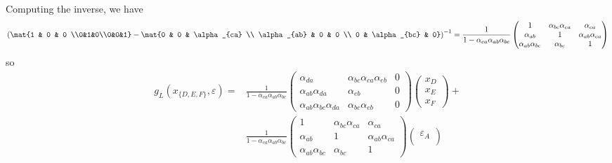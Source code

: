 \begin{enumerate}[label=11.\arabic*]
\begin{gradedsolution}
\begin{enumerate}
\begin{align*}
			\end{align*}
			Computing the inverse, we have
			\begin{equation*}
				\left(\mat{1 & 0           & 0              \\0&1&0\\0&0&1} - \mat{0 & 0 & \alpha_{ca}  \\
					\alpha_{ab}                                      & 0           & 0              \\
					0                                                & \alpha_{bc} & 0}\right)^{-1} = \frac{1}{1-\alpha_{ca}\alpha_{ab}\alpha_{bc}}\begin{pmatrix}
					1                      & \alpha_{bc}\alpha_{ca} & \alpha_{ca}            \\
					\alpha_{ab}            & 1                      & \alpha_{ab}\alpha_{ca} \\
					\alpha_{ab}\alpha_{bc} & \alpha_{bc}            & 1
				\end{pmatrix}
			\end{equation*}
			so
			\begin{align*}
				g_L(x_{\{D, E, F\}}, \varepsilon) = & \frac{1}{1-\alpha_{ca}\alpha_{ab}\alpha_{bc}}
				\begin{pmatrix}
					\alpha_{da}                       & \alpha_{bc}\alpha_{ca}\alpha_{eb} & 0 \\
					\alpha_{ab}\alpha_{da}            & \alpha_{eb}                       & 0 \\
					\alpha_{ab}\alpha_{bc}\alpha_{da} & \alpha_{bc}\alpha_{eb}            & 0
				\end{pmatrix}
				\begin{pmatrix}x_D \\ x_E\\ x_F \end{pmatrix}+                                      \\
				                                    & \frac{1}{1-\alpha_{ca}\alpha_{ab}\alpha_{bc}}
				\begin{pmatrix}
					1                      & \alpha_{bc}\alpha_{ca} & \alpha_{ca}            \\
					\alpha_{ab}            & 1                      & \alpha_{ab}\alpha_{ca} \\
					\alpha_{ab}\alpha_{bc} & \alpha_{bc}            & 1
				\end{pmatrix}
				\begin{pmatrix}
					\varepsilon_A \\

\end{pmatrix}
\end{align*}
\end{enumerate}
\end{gradedsolution}
\end{enumerate}

